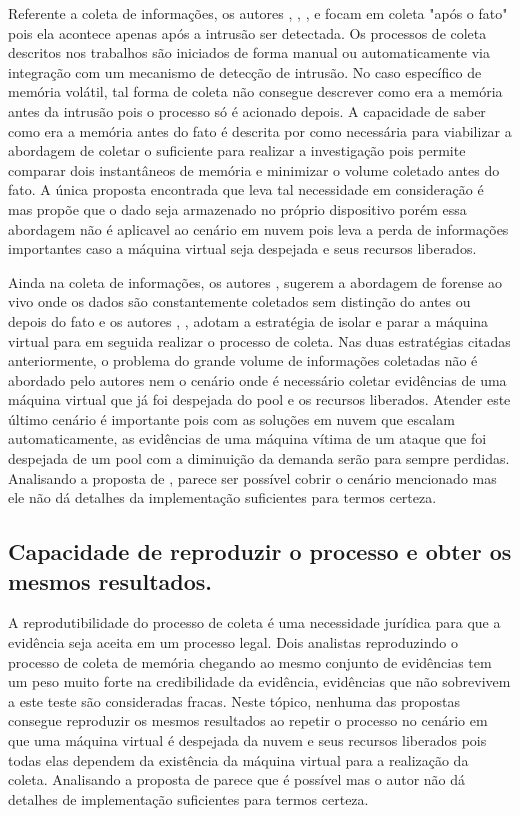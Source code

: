 \documentclass[
	12pt,				%
	openright,			%
	oneside,			%
	a4paper,			%
	english,			%
	brazil,				%
	]{abntex2}
\begin{document}
Referente a coleta de informações, os autores \cite{Reichert2015}, \cite{Poisel2013}, \cite{Dykstra2013}, \cite{George2012} e \cite{Sang2013}
focam em coleta "após o fato" pois ela acontece apenas após a intrusão ser detectada. Os processos de coleta descritos nos trabalhos são iniciados de forma manual ou 
automaticamente via integração com um mecanismo de detecção de intrusão. No caso específico de memória volátil, tal forma de coleta não consegue descrever como era 
a memória antes da intrusão pois o processo só é acionado depois. A capacidade de saber como era a memória antes do fato é descrita por \cite{Case2014} como necessária 
para viabilizar a abordagem de coletar o suficiente para realizar a investigação pois permite comparar dois instantâneos de memória e minimizar o volume coletado antes 
do fato. A única proposta encontrada que leva tal necessidade em consideração é \cite{Dezfouli2012} mas propõe que o dado seja armazenado no próprio dispositivo porém 
essa abordagem não é aplicavel ao cenário em nuvem pois leva a perda de informações importantes caso a máquina virtual seja despejada e seus recursos liberados.

Ainda na coleta de informações, os autores \cite{Reichert2015}, \cite{George2012} sugerem a abordagem de forense ao vivo onde os dados são constantemente coletados sem 
distinção do antes ou depois do fato e os autores \cite{Poisel2013}, \cite{Dykstra2013}, \cite{Sang2013} adotam a estratégia de isolar e parar a máquina virtual para 
em seguida realizar o processo de coleta. Nas duas estratégias citadas anteriormente, o problema do grande volume de informações coletadas não é abordado pelo autores 
nem o cenário onde é necessário coletar evidências de uma máquina virtual que já foi despejada do pool e os recursos liberados. Atender este último cenário é importante pois 
com as soluções em nuvem que escalam automaticamente, as evidências de uma máquina vítima de um ataque que foi despejada de um pool com a diminuição da demanda serão 
para sempre perdidas. Analisando a proposta de \cite{Poisel2013}, parece ser possível cobrir o cenário mencionado mas ele não dá detalhes da implementação suficientes
para termos certeza.

\subsection{Capacidade de reproduzir o processo e obter os mesmos resultados.}
\label{chp:reproduz-revisao}

A reprodutibilidade do processo de coleta é uma necessidade jurídica para que a evidência seja aceita em um processo legal. Dois analistas reproduzindo o processo de 
coleta de memória chegando ao mesmo conjunto de evidências tem um peso muito forte na credibilidade da evidência, evidências que não sobrevivem a este teste são
consideradas fracas. Neste tópico, nenhuma das propostas consegue reproduzir os mesmos resultados ao repetir o processo no cenário em que uma máquina virtual é despejada 
da nuvem e seus recursos liberados pois todas elas dependem da existência da máquina virtual para a realização da coleta. Analisando a proposta de \cite{George2012} 
parece que é possível mas o autor não dá detalhes de implementação suficientes para termos certeza.
\end{document}
